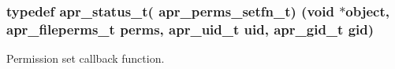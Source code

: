 \subsubsection[{\texorpdfstring{apr\+\_\+perms\+\_\+setfn\+\_\+t}{apr_perms_setfn_t}}]{\setlength{\rightskip}{0pt plus 5cm}typedef {\bf apr\+\_\+status\+\_\+t}( apr\+\_\+perms\+\_\+setfn\+\_\+t) ({\bf void} $\ast$object, {\bf apr\+\_\+fileperms\+\_\+t} {\bf perms}, {\bf apr\+\_\+uid\+\_\+t} uid, {\bf apr\+\_\+gid\+\_\+t} gid)}\hypertarget{group__apr__perms__set_ga65b3990e3ff0b2e9e3c3ebe417c464be}{}\label{group__apr__perms__set_ga65b3990e3ff0b2e9e3c3ebe417c464be}
Permission set callback function. 